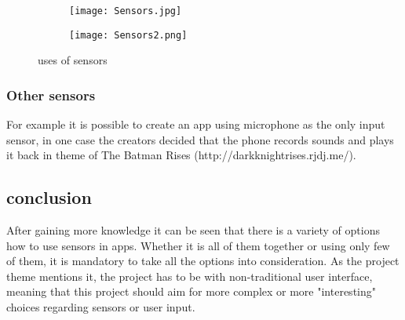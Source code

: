 \begin{figure}[H]
\centering
\begin{subfigure}{.5\textwidth}
  \centering
  \texttt{[image: Sensors.jpg]}
\end{subfigure}%
\begin{subfigure}{.5\textwidth}
  \centering
  \texttt{[image: Sensors2.png]}
\end{subfigure}
\caption{uses of sensors}
\end{figure}

\subsubsection*{Other sensors}
For example it is possible to create an app using microphone as the only input sensor, in one case the creators decided that the phone records sounds and plays it back in theme of The Batman Rises (http://darkknightrises.rjdj.me/).
\subsection{conclusion}
After gaining more knowledge it can be seen that there is a variety of options how to use sensors in apps. Whether it is all of them together or using only few of them, it is mandatory to take all the options into consideration. As the project theme mentions it, the project has to be with non-traditional user interface, meaning that this project should aim for more complex or more "interesting" choices regarding sensors or user input.
